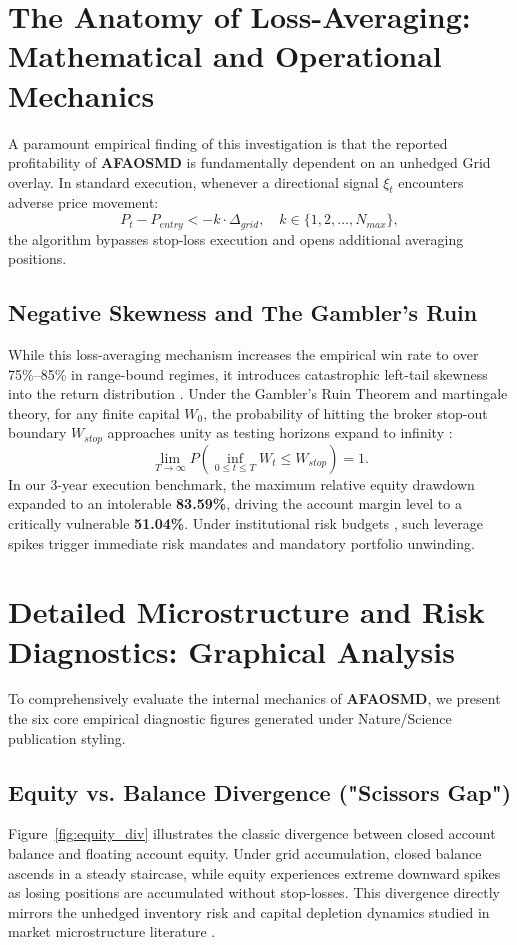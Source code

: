 \documentclass[11pt,a4paper]{article}
\begin{document}
\section{The Anatomy of Loss-Averaging: Mathematical and Operational Mechanics}
A paramount empirical finding of this investigation is that the reported profitability of \textbf{AFAOSMD} is fundamentally dependent on an unhedged Grid overlay. In standard execution, whenever a directional signal $\xi_t$ encounters adverse price movement:
\begin{equation}
P_t - P_{entry} < -k \cdot \Delta_{grid}, \quad k \in \{1, 2, \dots, N_{max}\},
\end{equation}
the algorithm bypasses stop-loss execution and opens additional averaging positions. 

\subsection{Negative Skewness and The Gambler's Ruin}
While this loss-averaging mechanism increases the empirical win rate to over 75\%--85\% in range-bound regimes, it introduces catastrophic left-tail skewness into the return distribution \cite{bouchaud2003theory, cont2001empirical}. Under the Gambler's Ruin Theorem and martingale theory, for any finite capital $W_0$, the probability of hitting the broker stop-out boundary $W_{stop}$ approaches unity as testing horizons expand to infinity \cite{bouchaud2009markets}:
\begin{equation}
\lim_{T \to \infty} P\left(\inf_{0 \le t \le T} W_t \le W_{stop}\right) = 1.
\end{equation}
In our 3-year execution benchmark, the maximum relative equity drawdown expanded to an intolerable \textbf{83.59\%}, driving the account margin level to a critically vulnerable \textbf{51.04\%}. Under institutional risk budgets \cite{rockafellar2000optimization, shleifer1997limits}, such leverage spikes trigger immediate risk mandates and mandatory portfolio unwinding.


\section{Detailed Microstructure and Risk Diagnostics: Graphical Analysis}
To comprehensively evaluate the internal mechanics of \textbf{AFAOSMD}, we present the six core empirical diagnostic figures generated under Nature/Science publication styling.

\subsection{Equity vs. Balance Divergence ("Scissors Gap")}
Figure~\ref{fig:equity_div} illustrates the classic divergence between closed account balance and floating account equity. Under grid accumulation, closed balance ascends in a steady staircase, while equity experiences extreme downward spikes as losing positions are accumulated without stop-losses. This divergence directly mirrors the unhedged inventory risk and capital depletion dynamics studied in market microstructure literature \cite{shleifer1997limits, bouchaud2009markets}.
\end{document}
